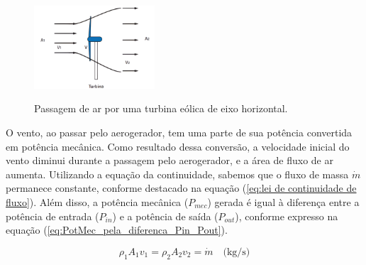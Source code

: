         \begin{figure}[h!]
            \centering
            \caption{Passagem de ar por uma turbina eólica de eixo horizontal.}
            \includegraphics[width=0.4\textwidth, height=0.4\textwidth]{Figuras/Teorico/Fluxo de ar através de uma turbina eólica de eixo horizontal.png}
            \label{fig:Passagem de ar por uma turbina eólica de eixo horizontal.}
        \end{figure}

    \par O vento, ao passar pelo aerogerador, tem uma parte de sua potência convertida em potência mecânica. Como resultado dessa conversão, a velocidade inicial do vento diminui durante a passagem pelo aerogerador, e a área de fluxo de ar aumenta. Utilizando a equação da continuidade, sabemos que o fluxo de massa $\dot{m}$ permanece constante, conforme destacado na equação (\ref{eq:lei de continuidade de fluxo}). Além disso, a potência mecânica ($P_{mec}$) gerada é igual à diferença entre a potência de entrada ($P_{in}$) e a potência de saída ($P_{out}$), conforme expresso na equação (\ref{eq:PotMec_pela_diferenca_Pin_Pout}).
    

    \begin{equation}
        \rho_1 A_1 v_1 = \rho_2 A_2 v_2 = \dot{m} \quad \text{(kg/s)}
        \label{eq:lei de continuidade de fluxo}
    \end{equation}
    
